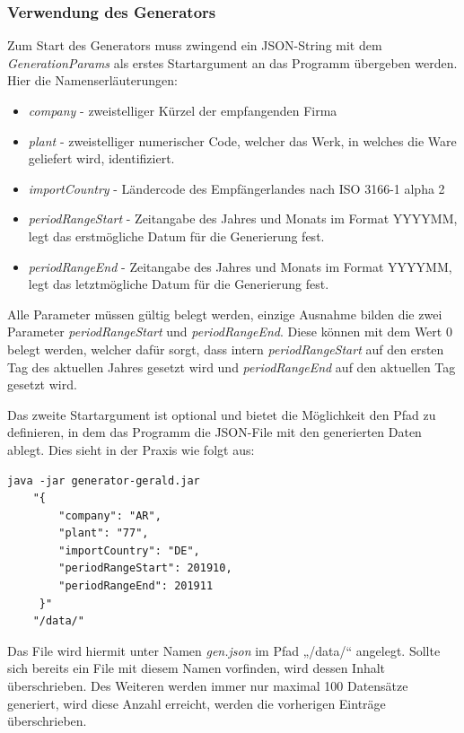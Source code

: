 \subsubsection{Verwendung des Generators}
Zum Start des Generators muss zwingend ein JSON-String mit dem \textit{GenerationParams} als erstes Startargument an das Programm übergeben werden. Hier die Namenserläuterungen:
\begin{itemize}
    \item \textit{company} - zweistelliger Kürzel der empfangenden Firma
    \item \textit{plant} - zweistelliger numerischer Code, welcher das Werk, in welches die Ware geliefert wird, identifiziert.
    \item \textit{importCountry} - Ländercode des Empfängerlandes nach ISO 3166-1 alpha 2
    \item \textit{periodRangeStart} - Zeitangabe des Jahres und Monats im Format YYYYMM, legt das erstmögliche Datum für die Generierung fest.
    \item \textit{periodRangeEnd} - Zeitangabe des Jahres und Monats im Format YYYYMM, legt das letztmögliche Datum für die Generierung fest.
\end{itemize}
Alle Parameter müssen gültig belegt werden, einzige Ausnahme bilden die zwei Parameter \textit{periodRangeStart}  und \textit{periodRangeEnd}. Diese können mit dem Wert 0 belegt werden, welcher dafür sorgt, dass intern \textit{periodRangeStart} auf den ersten Tag des aktuellen Jahres gesetzt wird und \textit{periodRangeEnd} auf den aktuellen Tag gesetzt wird.
\vspace{4mm}\par
Das zweite Startargument ist optional und bietet die Möglichkeit den Pfad zu definieren, in dem das Programm die JSON-File mit den generierten Daten ablegt. Dies sieht in der Praxis wie folgt aus:
\vspace{3mm}\par
\begin{lstlisting}[caption={Programmstart}]
java -jar generator-gerald.jar 
    "{  
        "company": "AR", 
        "plant": "77", 
        "importCountry": "DE", 
        "periodRangeStart": 201910,
        "periodRangeEnd": 201911
     }" 
    "/data/"
\end{lstlisting}
\vspace{4mm}\par
Das File wird hiermit unter Namen \textit{gen.json} im Pfad „/data/“ angelegt. Sollte sich bereits ein File mit diesem Namen vorfinden, wird dessen Inhalt überschrieben. Des Weiteren werden immer nur maximal 100 Datensätze generiert, wird diese Anzahl erreicht, werden die vorherigen Einträge überschrieben.


